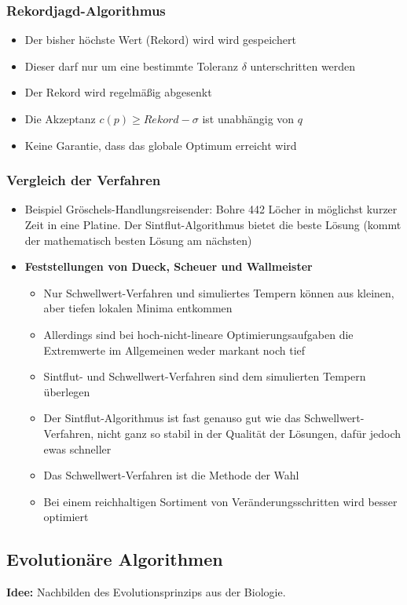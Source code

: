 \subsubsection{Rekordjagd-Algorithmus}
\begin{itemize}
	\item Der bisher höchste Wert (Rekord) wird wird gespeichert
	\item Dieser darf nur um eine bestimmte Toleranz \(\delta\) unterschritten werden
	\item Der Rekord wird regelmäßig abgesenkt
	\item Die Akzeptanz \(c(p) \geq Rekord-\sigma\) ist unabhängig von \(q\)
	\item Keine Garantie, dass das globale Optimum erreicht wird
\end{itemize}

\subsubsection{Vergleich der Verfahren}
\begin{itemize}
	\item Beispiel Gröschels-Handlungsreisender: Bohre 442 Löcher in möglichst kurzer Zeit in eine Platine. Der Sintflut-Algorithmus bietet die beste Lösung (kommt der mathematisch besten Lösung am nächsten)
	\item \textbf{Feststellungen von Dueck, Scheuer und Wallmeister}
	\begin{itemize}
		\item Nur Schwellwert-Verfahren und simuliertes Tempern können aus kleinen, aber tiefen lokalen Minima entkommen
		\item Allerdings sind bei hoch-nicht-lineare Optimierungsaufgaben die Extremwerte im Allgemeinen weder markant noch tief
		\item Sintflut- und Schwellwert-Verfahren sind dem simulierten Tempern überlegen
		\item Der Sintflut-Algorithmus ist fast genauso gut wie das Schwellwert-Verfahren, nicht ganz so stabil in der Qualität der Lösungen, dafür jedoch ewas schneller
		\item Das Schwellwert-Verfahren ist die Methode der Wahl
		\item Bei einem reichhaltigen Sortiment von Veränderungsschritten wird besser optimiert
	\end{itemize}
\end{itemize}


\subsection{Evolutionäre Algorithmen}
\textbf{Idee:} Nachbilden des Evolutionsprinzips aus der Biologie.

